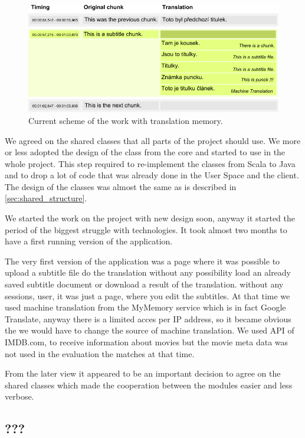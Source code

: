 \begin{figure}
\begin{center}
\includegraphics{./figures/current_strucutre.pdf}
\end{center}
\caption{Current scheme of the work with translation memory.}\label{fig:new_scheme}
\end{figure}

We agreed on the shared classes that all parts of the project should use.  We more or less adopted the design of the class from the core and started to use in the whole project. This step required to re-implement the classes from Scala to Java and to drop a lot of code that was already done in the User Space and the client. The design of the classes was almost the same as is described in \ref{sec:shared_structure}.

We started the work on the project with new design soon, anyway it started the period of the biggest struggle with technologies. It took almost two months to have a first running version of the application.

The very first version of the application was a page where it was possible to upload a subtitle file do the translation without any possibility load an already saved subtitle document or download a result of the translation. without any sessions, user, it was just a page, where you edit the subtitles. At that time we used machine translation from the MyMemory service which is in fact Google Translate, anyway there is a limited acces per IP address, so it became obvious the we would have to change the source of machine translation. We used API of IMDB.com, to receive information about movies but the movie meta data was not used in the evaluation the matches at that time.

From the later view it appeared to be an important decision to agree on the shared classes which made the cooperation between the modules easier and less verbose. 

\subsection{???}

